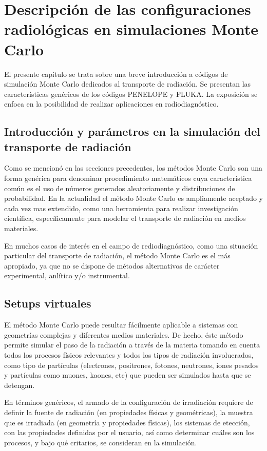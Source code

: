 \chapter{Descripci\'on de las configuraciones radiol\'ogicas en simulaciones Monte Carlo}

El presente capítulo se trata sobre una breve introducción a códigos de simulación Monte
Carlo dedicados al transporte de radiación. Se presentan las características genéricos de
los códigos PENELOPE y FLUKA. La exposición se enfoca en la posibilidad de realizar
aplicaciones en radiodiagnóstico.

\section{Introducción y par\'ametros en la simulación del transporte de radiaci\'on}

Como se mencionó en las secciones precedentes, los métodos Monte Carlo son una forma genérica para denominar procedimiento matemáticos cuya característica común es el uso de números generados aleatoriamente y distribuciones de probabilidad. En la actualidad el método Monte Carlo es ampliamente aceptado y cada vez mas extendido, como una herramienta para realizar investigación científica, específicamente para modelar el transporte de radiación en medios materiales.

En muchos casos de interés en el campo de rediodiagnóstico, como una situación particular del transporte de radiación, el método Monte Carlo es el más apropiado, ya que no se dispone de métodos alternativos de carácter experimental, anlítico y/o instrumental.

\section{Setups virtuales}

El método Monte Carlo puede resultar fácilmente aplicable a sistemas con geometrías complejas y diferentes medios materiales. De hecho, éste método permite simular el paso de la radiación a través de la materia tomando en cuenta todos los procesos físicos relevantes y todos los tipos de radiación involucrados, como tipo de partículas (electrones, positrones, fotones, neutrones, iones pesados y partículas como muones, kaones, etc) que pueden ser simulados hasta que se detengan.

En términos genéricos, el armado de la configuración de irradiación requiere de definir la fuente de radiación (en propiedades físicas y geométricas), la muestra que es irradiada (en geometría y propiedades físicas), los sistemas de etección, con las propiedades definidas por el usuario, así como determinar cuáles son los procesos, y bajo qué critarios, se consideran en la simulación.

